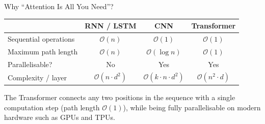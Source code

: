 \documentclass[aspectratio=169]{beamer}
\begin{document}
\begin{frame}{Why ``Attention Is All You Need''?}
  \begin{center}
  {\small
  \begin{tabular}{lccc}
    \toprule
    & \textbf{RNN / LSTM} & \textbf{CNN} & \textbf{Transformer} \\
    \midrule
    Sequential operations  & $\mathcal{O}(n)$         & $\mathcal{O}(1)$         & $\mathcal{O}(1)$ \\
    Maximum path length    & $\mathcal{O}(n)$         & $\mathcal{O}(\log n)$    & $\mathcal{O}(1)$ \\
    Parallelisable?        & No                       & Yes                      & Yes \\
    Complexity / layer     & $\mathcal{O}(n\cdot d^2)$ & $\mathcal{O}(k\cdot n\cdot d^2)$ & $\mathcal{O}(n^2\cdot d)$ \\
    \bottomrule
  \end{tabular}}
  \end{center}

  \vspace{0.5em}
  The Transformer connects any two positions in the sequence with a single computation
  step (path length $\mathcal{O}(1)$), while being fully parallelisable on modern
  hardware such as GPUs and TPUs.
\end{frame}









%
\end{document}
